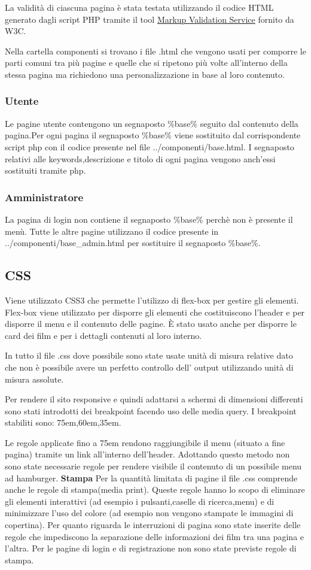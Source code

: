 \documentclass[a4paper]{article}
\begin{document}
La validit\`a di ciascuna pagina \`e stata testata utilizzando il codice HTML generato dagli script PHP tramite il tool \href{https://validator.w3.org/}{Markup Validation Service} fornito da W3C.

Nella cartella componenti si trovano i file .html che vengono usati per comporre le parti comuni tra pi\`u pagine e quelle
che si ripetono pi\`u volte all'interno della stessa pagina ma richiedono una personalizzazione in base al loro contenuto.
\subsubsection{Utente}
Le pagine utente contengono un segnaposto \%base\% seguito dal contenuto della pagina.Per ogni pagina il segnaposto \%base\% viene sostituito 
dal corrispondente script php con il codice presente nel file ../componenti/base.html.
I segnaposto relativi alle keywords,descrizione e titolo di ogni pagina vengono anch'essi sostituiti tramite php.
\subsubsection{Amministratore}
La pagina di login non contiene il segnaposto \%base\% perch\`e non \`e presente il men\`u. Tutte le altre pagine utilizzano il codice presente
in ../componenti/base\_admin.html per sostituire il segnaposto \%base\%.

\subsection{CSS}
Viene utilizzato CSS3 che permette l'utilizzo di flex-box per gestire gli elementi.
Flex-box viene utilizzato per disporre gli elementi che costituiscono l'header e per disporre il menu e il contenuto delle pagine.
\`E stato usato anche per disporre le card dei film e per i dettagli contenuti al loro interno.

In tutto il file .css dove possibile sono state usate unit\`a di misura relative dato che non \`e possibile avere un perfetto controllo dell'
output utilizzando unit\`a di misura assolute.

Per rendere il sito responsive e quindi adattarsi a schermi di dimensioni differenti sono stati introdotti dei breakpoint
facendo uso delle media query.
I breakpoint stabiliti sono: 75em,60em,35em.

Le regole applicate fino a 75em rendono raggiungibile il menu (situato a fine pagina) tramite un link all'interno dell'header.
Adottando questo metodo non sono state necessarie regole per rendere visibile il contenuto di un possibile menu ad hamburger.
\textbf{Stampa}
Per la quantit\`a limitata di pagine il file .css comprende anche le regole di stampa(media print).
Queste regole hanno lo scopo di eliminare gli elementi interattivi (ad esempio i pulsanti,caselle di ricerca,menu) e di minimizzare l'uso 
del colore (ad esempio non vengono stampate le immagini di copertina).
Per quanto riguarda le interruzioni di pagina sono state inserite delle regole che impediscono la separazione delle informazioni dei film tra una 
pagina e l'altra.
Per le pagine di login e di registrazione non sono state previste regole di stampa.
\end{document}
